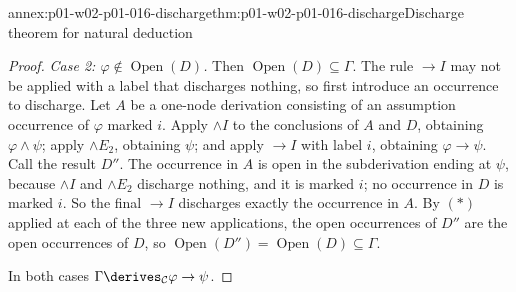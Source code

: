 \begin{annexitem}{annex:p01-w02-p01-016-discharge}{thm:p01-w02-p01-016-discharge}{Discharge theorem for natural deduction}
\begin{proof}
\emph{Case 2: \(\varphi\notin\operatorname{Open}(D)\).} Then
\(\operatorname{Open}(D)\subseteq\Gamma\). The rule \(\to I\) may not be
applied with a label that discharges nothing, so first introduce an occurrence
to discharge. Let \(A\) be a one-node derivation consisting of an assumption
occurrence of \(\varphi\) marked \(i\). Apply \(\land I\) to the conclusions
of \(A\) and \(D\), obtaining \(\varphi\land\psi\); apply \(\land E_2\),
obtaining \(\psi\); and apply \(\to I\) with label \(i\), obtaining
\(\varphi\to\psi\). Call the result \(D''\). The occurrence in \(A\) is open
in the subderivation ending at \(\psi\), because \(\land I\) and
\(\land E_2\) discharge nothing, and it is marked \(i\); no occurrence in
\(D\) is marked \(i\). So the final \(\to I\) discharges exactly the
occurrence in \(A\). By \((\ast)\) applied at each of the three new
applications, the open occurrences of \(D''\) are the open occurrences of
\(D\), so \(\operatorname{Open}(D'')=\operatorname{Open}(D)\subseteq\Gamma\).

In both cases \(\Gamma\derives_{\mathcal C}\varphi\to\psi\).
\end{proof}
\end{annexitem}

